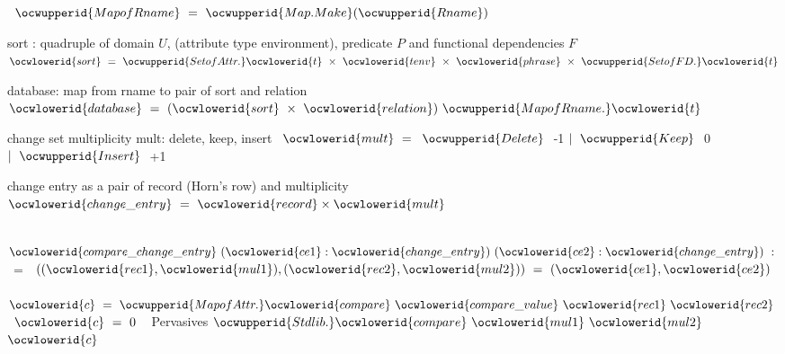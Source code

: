 \documentclass[12pt]{article}
\begin{document}
\label{rellens_types.ml:3789}%
\ocwindent{0.00em}
~$\ocwupperid{MapofRname}~=~\ocwupperid{Map.Make}(\ocwupperid{Rname})$\medskip

\ocwendcode{}\ocwindent{0.00em}
sort : quadruple of domain $U$, (attribute type environment), predicate $P$ and functional dependencies $F$ 
\ocweol
\label{rellens_types.ml:3940}%
\medskip
\ocwbegincode{}\ocwindent{0.00em}
~$\ocwlowerid{sort}~=~\ocwupperid{SetofAttr.}\ocwlowerid{t}~\times{}~\ocwlowerid{tenv}~\times{}~\ocwlowerid{phrase}~\times{}~\ocwupperid{SetofFD.}\ocwlowerid{t}$\medskip

\ocwendcode{}\ocwindent{0.00em}
database: map from rname to pair of sort and relation 
\ocweol
\label{rellens_types.ml:4053}%
\medskip
\ocwbegincode{}\ocwindent{0.00em}
~$\ocwlowerid{database}~=~(\ocwlowerid{sort}~\times{}~\ocwlowerid{relation})~\ocwupperid{MapofRname.}\ocwlowerid{t}$\medskip

\ocwendcode{}\ocwindent{0.00em}
change set 
\ocweol
\ocwindent{0.00em}
multiplicity mult: delete, keep, insert 
\ocweol
\label{rellens_types.ml:4164}%
\medskip
\ocwbegincode{}\ocwindent{0.00em}
~$\ocwlowerid{mult}~=~$\ocweol
\ocwindent{2.00em}
$\ocwupperid{Delete}~$\ocwbc{} -1 \ocwec{}\ocweol
\ocwindent{1.00em}
$\mid{}~\ocwupperid{Keep}~$\ocwbc{}  0 \ocwec{}\ocweol
\ocwindent{1.00em}
$\mid{}~\ocwupperid{Insert}~$\ocwbc{} +1 \ocwec{}\medskip

\ocwendcode{}\ocwindent{0.00em}
change entry as a pair of record (Horn's row) and multiplicity 
\ocweol
\label{rellens_types.ml:4310}%
\medskip
\ocwbegincode{}\ocwindent{0.00em}
~$\ocwlowerid{change\_entry}~=~\ocwlowerid{record}\times{}\ocwlowerid{mult}$\medskip

\label{rellens_types.ml:4343}%
\ocwindent{0.00em}
~$\ocwlowerid{compare\_change\_entry}~(\ocwlowerid{ce1}:\ocwlowerid{change\_entry})~(\ocwlowerid{ce2}:\ocwlowerid{change\_entry})~:~$~=\ocweol
\ocwindent{2.00em}
~$((\ocwlowerid{rec1},\ocwlowerid{mul1}),(\ocwlowerid{rec2},\ocwlowerid{mul2}))~=~(\ocwlowerid{ce1},\ocwlowerid{ce2})~$\ocweol
\ocwindent{2.00em}
~$\ocwlowerid{c}~=~\ocwupperid{MapofAttr.}\ocwlowerid{compare}~\ocwlowerid{compare\_value}~\ocwlowerid{rec1}~\ocwlowerid{rec2}~$\ocweol
\ocwindent{2.00em}
~$\ocwlowerid{c}~=~0$\ocweol
\ocwindent{2.00em}
~\ocwbc{} Pervasives \ocwec{}$\ocwupperid{Stdlib.}\ocwlowerid{compare}~\ocwlowerid{mul1}~\ocwlowerid{mul2}~$\ocweol
\ocwindent{2.00em}
~$\ocwlowerid{c}$\medskip
\end{document}
